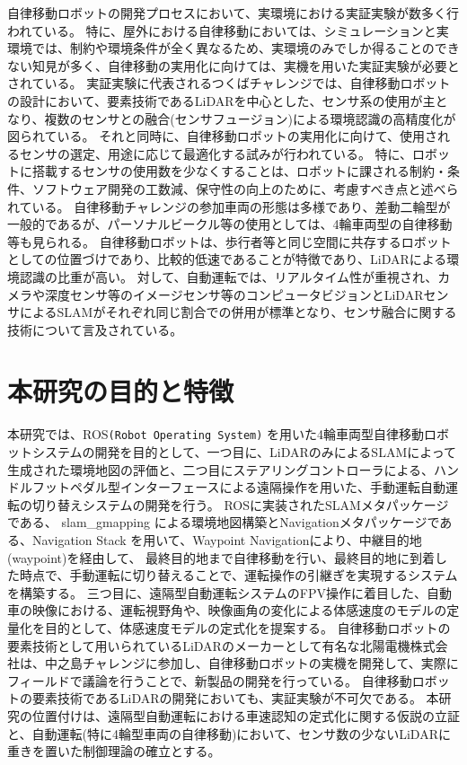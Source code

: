 自律移動ロボットの開発プロセスにおいて、実環境における実証実験が数多く行われている。
特に、屋外における自律移動においては、シミュレーションと実環境では、制約や環境条件が全く異なるため、実環境のみでしか得ることのできない知見が多く、自律移動の実用化に向けては、実機を用いた実証実験が必要とされている。
実証実験に代表されるつくばチャレンジでは、自律移動ロボットの設計において、要素技術であるLiDARを中心とした、センサ系の使用が主となり、複数のセンサとの融合(センサフュージョン)による環境認識の高精度化が図られている。
それと同時に、自律移動ロボットの実用化に向けて、使用されるセンサの選定、用途に応じて最適化する試みが行われている。
特に、ロボットに搭載するセンサの使用数を少なくすることは、ロボットに課される制約・条件、ソフトウェア開発の工数減、保守性の向上のために、考慮すべき点と述べられている。
自律移動チャレンジの参加車両の形態は多様であり、差動二輪型が一般的であるが、パーソナルビークル等の使用としては、4輪車両型の自律移動等も見られる。
自律移動ロボットは、歩行者等と同じ空間に共存するロボットとしての位置づけであり、比較的低速であることが特徴であり、LiDARによる環境認識の比重が高い。
対して、自動運転では、リアルタイム性が重視され、カメラや深度センサ等のイメージセンサ等のコンピュータビジョンとLiDARセンサによるSLAMがそれぞれ同じ割合での併用が標準となり、センサ融合に関する技術について言及されている。

\section{本研究の目的と特徴}
本研究では、ROS\verb|(Robot Operating System)|
を用いた4輪車両型自律移動ロボットシステムの開発を目的として、一つ目に、LiDARのみによるSLAMによって生成された環境地図の評価と、二つ目にステアリングコントローラによる、ハンドルフットペダル型インターフェースによる遠隔操作を用いた、手動運転自動運転の切り替えシステムの開発を行う。
ROSに実装されたSLAMメタパッケージである、
slam\_gmapping
による環境地図構築とNavigationメタパッケージである、Navigation Stack を用いて、Waypoint Navigationにより、中継目的地(waypoint)を経由して、
最終目的地まで自律移動を行い、最終目的地に到着した時点で、手動運転に切り替えることで、運転操作の引継ぎを実現するシステムを構築する。
三つ目に、遠隔型自動運転システムのFPV操作に着目した、自動車の映像における、運転視野角や、映像画角の変化による体感速度のモデルの定量化を目的として、体感速度モデルの定式化を提案する。
自律移動ロボットの要素技術として用いられているLiDARのメーカーとして有名な北陽電機株式会社は、中之島チャレンジに参加し、自律移動ロボットの実機を開発して、実際にフィールドで議論を行うことで、新製品の開発を行っている。
自律移動ロボットの要素技術であるLiDARの開発においても、実証実験が不可欠である。
本研究の位置付けは、遠隔型自動運転における車速認知の定式化に関する仮説の立証と、自動運転(特に4輪型車両の自律移動)において、センサ数の少ないLiDARに重きを置いた制御理論の確立とする。

